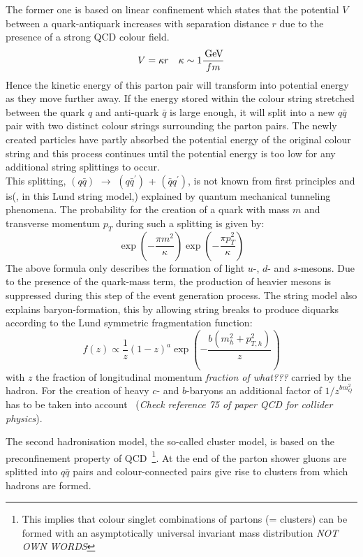 The former one is based on linear confinement which states that the potential $V$ between a quark-antiquark increases with separation distance $r$ due to the presence of a strong QCD colour field.%
\begin{equation}\label{eq::VQCD}
 V = \kappa r ~~~ \kappa \sim 1 \dfrac{\, \mathrm{GeV}}{fm}
\end{equation}
Hence the kinetic energy of this parton pair will transform into potential energy as they move further away. If the energy stored within the colour string stretched between the quark $q$ and anti-quark $\bar{q}$ is large enough, it will split into a new $q\bar{q}$ pair with two distinct colour strings surrounding the parton pairs. The newly created particles have partly absorbed the potential energy of the original colour string and this process continues until the potential energy is too low for any additional string splittings to occur.
\\
This splitting, $(q\bar{q})$ $\rightarrow$ $(q\bar{q}^{'})$ + $(\bar{q}q^{'})$, is not known from first principles and is(, in this Lund string model,) explained by quantum mechanical tunneling phenomena. The probability for the creation of a quark with mass $m$ and transverse momentum $p_{T}$ during such a splitting is given by:
\begin{equation}
 \exp \left( -\frac{\pi m^{2}}{\kappa} \right) \exp \left(-\frac{\pi p_{T}^{2}}{\kappa} \right)
\end{equation}
The above formula only describes the formation of light $u$-, $d$- and $s$-mesons. Due to the presence of the quark-mass term, the production of heavier mesons is suppressed during this step of the event generation process. The string model also explains baryon-formation, this by allowing string breaks to produce diquarks according to the Lund symmetric fragmentation function:
\begin{equation}
 f(z) \propto \frac{1}{z} (1-z)^{a} \exp \left( - \frac{b(m_{h}^{2} + p_{T,h}^{2})}{z} \right)
\end{equation}
with $z$ the fraction of longitudinal momentum \textit{fraction of what???} carried by the hadron. For the creation of heavy $c$- and $b$-baryons an additional factor of $1/z^{bm_{Q}^{2}}$ has to be taken into account~\cite{} (\textit{Check reference 75 of paper QCD for collider physics}).

The second hadronisation model, the so-called cluster model, is based on the preconfinement property of QCD~\footnote{This implies that colour singlet combinations of partons (= clusters) can be formed with an asymptotically universal invariant mass distribution \textit{NOT OWN WORDS}}. At the end of the parton shower gluons are splitted into $q\bar{q}$ pairs and colour-connected pairs give rise to clusters from which hadrons are formed.


